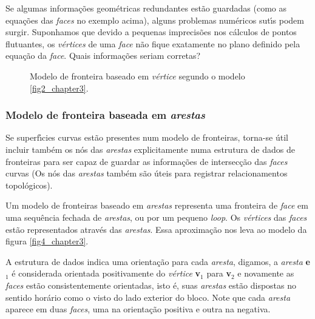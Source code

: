 \documentclass[12pt,a4paper]{book}
\begin{document}
Se algumas informa\c{c}\~{o}es geom\'{e}tricas redundantes est\~{a}o
guardadas (como as equa\c{c}\~{o}es das \textit{faces} no exemplo acima),
alguns problemas num\'{e}ricos sut\'{\i}s podem surgir. Suponhamos que
devido a pequenas imprecis\~{o}es nos c\'{a}lculos de pontos flutuantes, os 
\textit{v\'{e}rtices} de uma \textit{face} n\~{a}o fique exatamente no plano
definido pela equa\c{c}\~{a}o da \textit{face}. Quais informa\c{c}\~{o}es
seriam corretas?

\begin{figure}[htbp]
  \begin{center}
    \leavevmode
    
    \caption{Modelo de fronteira baseado em \textit{v\'{e}rtice} segundo o modelo \ref{fig2_chapter3}.}  
    \label{fig3_chapter3}
  \end{center}
\end{figure}

\subsubsection{Modelo de fronteira baseada em \textit{arestas}}

Se superf\'{\i}cies curvas est\~{a}o presentes num modelo de fronteiras,
torna-se \'{u}til incluir tamb\'{e}m os n\'{o}s das \textit{arestas}
explicitamente numa estrutura de dados de fronteiras para ser capaz de
guardar as informa\c{c}\~{o}es de intersec\c{c}\~{a}o das \textit{faces}
curvas (Os n\'{o}s das \textit{arestas} tamb\'{e}m s\~{a}o \'{u}teis para
registrar relacionamentos topol\'{o}gicos).

Um modelo de fronteiras baseado em \textit{arestas} representa uma fronteira
de \textit{face} em uma sequ\^{e}ncia fechada de \textit{arestas}, ou por um
pequeno \textit{loop}. Os \textit{v\'{e}rtices} das \textit{faces} est\~{a}o
representados atrav\'{e}s das \textit{arestas}. Essa aproxima\c{c}\~{a}o nos leva
ao modelo da figura \ref{fig4_chapter3}. 

A estrutura de dados indica uma orienta\c{c}\~{a}o para cada \textit{aresta},
digamos, a \textit{aresta} \textbf{e}$_{1}$ \'{e} considerada orientada
positivamente do \textit{v\'{e}rtice} \textbf{v}$_{1}$ para \textbf{v}$_{2}$ e
novamente as \textit{faces} est\~{a}o consistentemente orientadas, isto \'{e},
suas \textit{arestas} est\~{a}o dispostas no sentido hor\'{a}rio como o visto
do lado exterior do bloco. Note que cada \textit{aresta} aparece em duas \textit{%
faces}, uma na orienta\c{c}\~{a}o positiva e outra na negativa.
\end{document}
